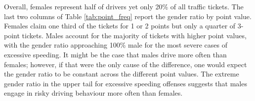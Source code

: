% 
%
%
Overall, females represent half of drivers 
yet only 20\% of all traffic tickets. 
%
The last two columns of
Table \ref{tab:point_freq}
report the gender ratio by point value.
% 
Females claim one third of the tickets for 1 or 2 points
but only a quarter of 3-point tickets. 
Males account for the majority of tickets with higher point values, 
with the gender ratio approaching 100\% male 
for the most severe cases of excessive speeding. 
% 
It might be the case that males drive more often than females; 
however, if that were the only cause of the difference, one would 
expect the gender ratio to be constant across the different point values. 
%
The extreme gender ratio in the upper tail for excessive speeding offenses 
suggests that males engage in risky driving behaviour 
more often than females. 




